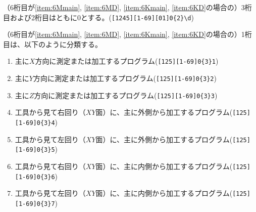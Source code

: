 （6桁目が\ref{item:6Mmain}, \ref{item:6MD}, \ref{item:6Kmain}, \ref{item:6KD}\hx の場合の）3桁目および2桁目はともに0とする。(\verb|[1245][1-69][01]0{2}\d|)


\clearpage
（6桁目が\ref{item:6Mmain}, \ref{item:6MD}, \ref{item:6Kmain}, \ref{item:6KD}\hx の場合の）1桁目は、以下のように分類する。
\begin{enumerate}[label=\arabic*.]
\item 主に$X$方向に測定または加工するプログラム(\verb|[125][1-69]0{3}1|)
\item 主に$Y$方向に測定または加工するプログラム(\verb|[125][1-69]0{3}2|)
\item 主に$Z$方向に測定または加工するプログラム(\verb|[125][1-69]0{3}3|)
\item 工具から見て右回り（$XY$面）に、主に外側から加工するプログラム(\verb|[125][1-69]0{3}4|)
\item 工具から見て左回り（$XY$面）に、主に外側から加工するプログラム(\verb|[125][1-69]0{3}5|)
\item 工具から見て右回り（$XY$面）に、主に内側から加工するプログラム(\verb|[125][1-69]0{3}6|)
\item 工具から見て左回り（$XY$面）に、主に内側から加工するプログラム(\verb|[125][1-69]0{3}7|)
\end{enumerate}
